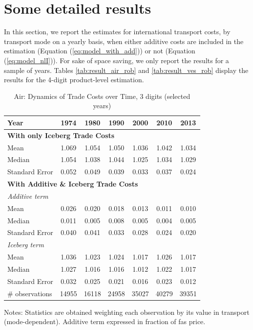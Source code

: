 \documentclass[a4paper,11pt]{article}
\begin{document}
\section{Some detailed results \label{app:more_results}}

In this section, we report the estimates for international transport costs, by transport mode on a yearly basis, when either additive costs are included in the estimation (Equation (\ref{eq:model_with_add})) or not (Equation (\ref{eq:model_nlI})). For sake of space saving, we only report the results for a sample of years. Tables \ref{tab:result_air_rob} and \ref{tab:result_ves_rob} display the results for the 4-digit product-level estimation.


\begin{table}[htbp]
  \centering
  \caption{Air: Dynamics of Trade Costs over Time, 3 digits (selected years)}
\begin{center}
    \begin{tabular}{l|cccccc}
\hline\hline

Year & 1974  & 1980  & 1990  & 2000  & 2010  & 2013   \\ \hline
\multicolumn{7}{l}{\textbf{With only Iceberg Trade Costs}}     \\
Mean  & 1.069 & 1.054 & 1.050 & 1.036 & 1.042 & 1.034  \\
Median & 1.054 & 1.038 & 1.044 & 1.025 & 1.034 & 1.029  \\
Standard Error & 0.052 & 0.049 & 0.039 & 0.033 & 0.037 & 0.024 \\
\hline
\multicolumn{7}{l}{\textbf{With Additive \& Iceberg Trade Costs }}    \\
\multicolumn{1}{l}{\textit{Additive term }} &       &       &       &       &       &      \\
\multicolumn{1}{l}{Mean } & 0.026 & 0.020 & 0.018 & 0.013 & 0.011 & 0.010  \\
\multicolumn{1}{l}{Median} & 0.011 & 0.005 & 0.008 & 0.005 & 0.004 & 0.005  \\
\multicolumn{1}{l}{Standard Error} & 0.040 & 0.041 & 0.033 & 0.028 & 0.024 & 0.020  \\
\multicolumn{1}{l}{\textit{Iceberg term}} &       &       &       &       &       &        \\
\multicolumn{1}{l}{Mean } & 1.036 & 1.023 & 1.024 & 1.017 & 1.026 & 1.017  \\
\multicolumn{1}{l}{Median} & 1.027 & 1.016 & 1.016 & 1.012 & 1.022 & 1.017 \\
Standard Error & 0.032 & 0.025 & 0.021 & 0.016 & 0.023 & 0.012  \\ \hline
\# observations & 14955 & 16118 & 24958 & 35027 & 40279 & 39351  \\
\hline\hline
    \end{tabular}%
  \end{center}
  \label{tab:result_air_3d_detail}%
\tiny{Notes: Statistics are obtained weighting each observation by its value in transport (mode-dependent). Additive term expressed in fraction of fas price. }
\end{table}%
\end{document}
